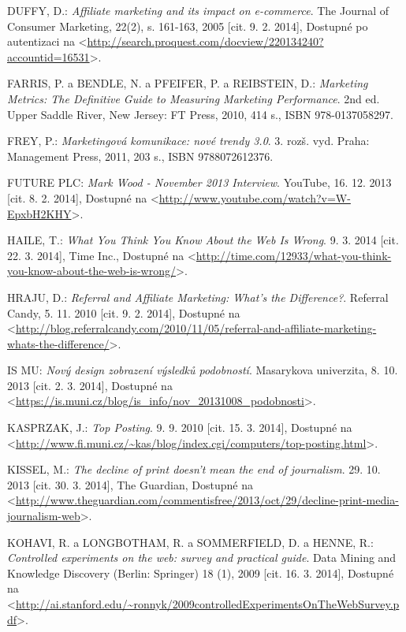\documentclass[12pt,twoside,openany]{fithesis}
\begin{document}
\begin{thebibliography}{99}
DUFFY, D.: \emph{Affiliate marketing and its impact on e-commerce}. The Journal of Consumer Marketing, 22(2),
        s. 161-163, 2005 [cit. 9. 2. 2014], Dostupné po autentizaci na {\textless}\url{http://search.proquest.com/docview/220134240?accountid=16531}{\textgreater}.

FARRIS, P. a BENDLE, N. a PFEIFER, P. a REIBSTEIN, D.: \emph{Marketing Metrics: The Definitive Guide to Measuring Marketing
      Performance}. 2nd ed. Upper Saddle River, New Jersey: FT Press, 2010, 414 s., ISBN 978-0137058297.

FREY, P.: \emph{Marketingová komunikace: nové trendy 3.0}. 3. rozš. vyd. Praha: Management Press, 2011, 203 s., ISBN 9788072612376.

FUTURE PLC: \emph{Mark Wood - November 2013 Interview}. YouTube, 16. 12. 2013 [cit. 8. 2. 2014], Dostupné na {\textless}\url{http://www.youtube.com/watch?v=W-EpxbH2KHY}{\textgreater}.

HAILE, T.: \emph{What You Think You Know About the Web Is Wrong}. 9. 3. 2014 [cit. 22. 3. 2014], Time Inc., Dostupné na {\textless}\url{http://time.com/12933/what-you-think-you-know-about-the-web-is-wrong/}{\textgreater}.

HRAJU, D.: \emph{Referral and Affiliate Marketing: What's the Difference?}. Referral Candy, 5. 11. 2010 [cit. 9. 2. 2014], Dostupné na {\textless}\url{http://blog.referralcandy.com/2010/11/05/referral-and-affiliate-marketing-whats-the-difference/}{\textgreater}.

IS MU: \emph{Nový design zobrazení výsledků podobností}. Masarykova univerzita, 8. 10. 2013 [cit. 2. 3. 2014], Dostupné na {\textless}\url{https://is.muni.cz/blog/is_info/nov_20131008_podobnosti}{\textgreater}.

KASPRZAK, J.: \emph{Top Posting}. 9. 9. 2010 [cit. 15. 3. 2014], Dostupné na {\textless}\url{http://www.fi.muni.cz/~kas/blog/index.cgi/computers/top-posting.html}{\textgreater}.

KISSEL, M.: \emph{The decline of print doesn't mean the end of journalism}. 29. 10. 2013 [cit. 30. 3. 2014], The Guardian, Dostupné na {\textless}\url{http://www.theguardian.com/commentisfree/2013/oct/29/decline-print-media-journalism-web}{\textgreater}.

KOHAVI, R. a LONGBOTHAM, R. a SOMMERFIELD, D. a HENNE, R.: \emph{Controlled experiments on the web: survey and practical
      guide}. Data Mining and Knowledge Discovery (Berlin: Springer)
        18 (1), 2009 [cit. 16. 3. 2014], Dostupné na {\textless}\url{http://ai.stanford.edu/~ronnyk/2009controlledExperimentsOnTheWebSurvey.pdf}{\textgreater}. 


\end{thebibliography}
\end{document}

